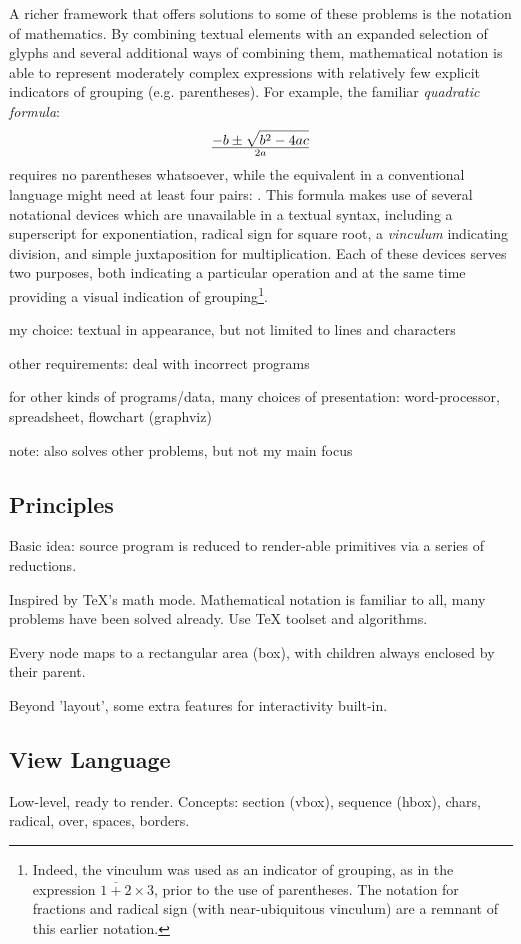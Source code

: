 A richer framework that offers solutions to some of these problems is the notation of mathematics. By combining textual elements with an expanded selection of glyphs and several additional ways of combining them, mathematical notation is able to represent moderately complex expressions with relatively few explicit indicators of grouping (e.g. parentheses). For example, the familiar \emph{quadratic formula}:
$${-b \pm\sqrt{b^2-4ac}} \over 2a$$
requires no parentheses whatsoever, while the equivalent in a conventional language might need at least four pairs: . This formula makes use of several notational devices which are unavailable in a textual syntax, including a superscript for exponentiation, radical sign for square root, a \emph{vinculum} indicating division, and simple juxtaposition for multiplication. Each of these devices serves two purposes, both indicating a particular operation and at the same time providing a visual indication of grouping\footnote{Indeed, the vinculum was used as an indicator of grouping, as in the expression $\overline{1+2} \times 3$, prior to the use of parentheses\cite{cajori}. The notation for fractions and radical sign (with near-ubiquitous vinculum) are a remnant of this earlier notation.}.

my choice: textual in appearance, but not limited to lines and characters

other requirements: deal with incorrect programs

for other kinds of programs/data, many choices of presentation: word-processor, spreadsheet, flowchart (graphviz)

note: also solves other problems, but not my main focus

\subsection{Principles}
Basic idea: source program is reduced to render-able primitives via a series of reductions.

Inspired by TeX's math mode. Mathematical notation is familiar to all, many problems have been solved already. Use TeX toolset and algorithms.

Every node maps to a rectangular area (box), with children always enclosed by their parent.

Beyond 'layout', some extra features for interactivity built-in.

\subsection{View Language}
Low-level, ready to render. Concepts: section (vbox), sequence (hbox), chars, radical, over, spaces, borders.

